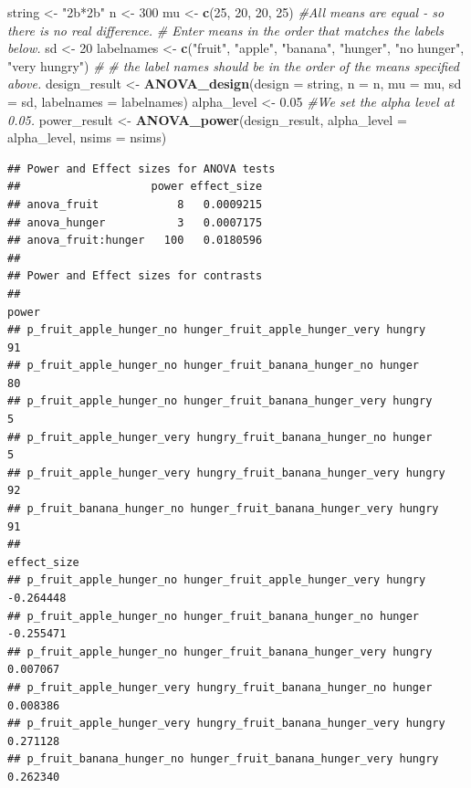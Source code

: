 \documentclass[]{book}
\newenvironment{Shaded}{\begin{snugshade}}{\end{snugshade}}
\newcommand{\CommentTok}[1]{\textcolor[rgb]{0.56,0.35,0.01}{\textit{#1}}}
\newcommand{\DataTypeTok}[1]{\textcolor[rgb]{0.13,0.29,0.53}{#1}}
\newcommand{\DecValTok}[1]{\textcolor[rgb]{0.00,0.00,0.81}{#1}}
\newcommand{\FloatTok}[1]{\textcolor[rgb]{0.00,0.00,0.81}{#1}}
\newcommand{\KeywordTok}[1]{\textcolor[rgb]{0.13,0.29,0.53}{\textbf{#1}}}
\newcommand{\NormalTok}[1]{#1}
\newcommand{\StringTok}[1]{\textcolor[rgb]{0.31,0.60,0.02}{#1}}
\begin{document}
\begin{Shaded}
\begin{Highlighting}[]
\NormalTok{string <-}\StringTok{ "2b*2b"}
\NormalTok{n <-}\StringTok{ }\DecValTok{300}
\NormalTok{mu <-}\StringTok{ }\KeywordTok{c}\NormalTok{(}\DecValTok{25}\NormalTok{, }\DecValTok{20}\NormalTok{, }\DecValTok{20}\NormalTok{, }\DecValTok{25}\NormalTok{) }\CommentTok{#All means are equal - so there is no real difference.}
\CommentTok{# Enter means in the order that matches the labels below.}
\NormalTok{sd <-}\StringTok{ }\DecValTok{20}
\NormalTok{labelnames <-}\StringTok{ }\KeywordTok{c}\NormalTok{(}\StringTok{"fruit"}\NormalTok{, }\StringTok{"apple"}\NormalTok{, }\StringTok{"banana"}\NormalTok{, }\StringTok{"hunger"}\NormalTok{, }\StringTok{"no hunger"}\NormalTok{, }\StringTok{"very hungry"}\NormalTok{) }\CommentTok{#}
\CommentTok{# the label names should be in the order of the means specified above.}
\NormalTok{design_result <-}\StringTok{ }\KeywordTok{ANOVA_design}\NormalTok{(}\DataTypeTok{design =}\NormalTok{ string,}
                   \DataTypeTok{n =}\NormalTok{ n, }
                   \DataTypeTok{mu =}\NormalTok{ mu, }
                   \DataTypeTok{sd =}\NormalTok{ sd, }
                   \DataTypeTok{labelnames =}\NormalTok{ labelnames)}
\NormalTok{alpha_level <-}\StringTok{ }\FloatTok{0.05} \CommentTok{#We set the alpha level at 0.05. }
\NormalTok{power_result <-}\StringTok{ }\KeywordTok{ANOVA_power}\NormalTok{(design_result, }\DataTypeTok{alpha_level =}\NormalTok{ alpha_level, }\DataTypeTok{nsims =}\NormalTok{ nsims)}
\end{Highlighting}
\end{Shaded}

\begin{verbatim}
## Power and Effect sizes for ANOVA tests
##                    power effect_size
## anova_fruit            8   0.0009215
## anova_hunger           3   0.0007175
## anova_fruit:hunger   100   0.0180596
## 
## Power and Effect sizes for contrasts
##                                                                  power
## p_fruit_apple_hunger_no hunger_fruit_apple_hunger_very hungry       91
## p_fruit_apple_hunger_no hunger_fruit_banana_hunger_no hunger        80
## p_fruit_apple_hunger_no hunger_fruit_banana_hunger_very hungry       5
## p_fruit_apple_hunger_very hungry_fruit_banana_hunger_no hunger       5
## p_fruit_apple_hunger_very hungry_fruit_banana_hunger_very hungry    92
## p_fruit_banana_hunger_no hunger_fruit_banana_hunger_very hungry     91
##                                                                  effect_size
## p_fruit_apple_hunger_no hunger_fruit_apple_hunger_very hungry      -0.264448
## p_fruit_apple_hunger_no hunger_fruit_banana_hunger_no hunger       -0.255471
## p_fruit_apple_hunger_no hunger_fruit_banana_hunger_very hungry      0.007067
## p_fruit_apple_hunger_very hungry_fruit_banana_hunger_no hunger      0.008386
## p_fruit_apple_hunger_very hungry_fruit_banana_hunger_very hungry    0.271128
## p_fruit_banana_hunger_no hunger_fruit_banana_hunger_very hungry     0.262340
\end{verbatim}
\end{document}
